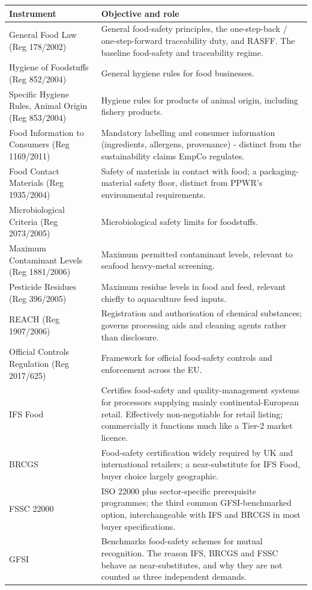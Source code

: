 \footnotesize
\begin{xltabular}{\textwidth}{@{} p{4.1cm} X @{}}
\toprule \textbf{Instrument} & \textbf{Objective and role} \\ \midrule \endhead
General Food Law (Reg 178/2002) & General food-safety principles, the
one-step-back / one-step-forward traceability duty, and RASFF. The baseline
food-safety and traceability regime. \\
Hygiene of Foodstuffs (Reg 852/2004) & General hygiene rules for food businesses. \\
Specific Hygiene Rules, Animal Origin (Reg 853/2004) & Hygiene rules for products
of animal origin, including fishery products. \\
Food Information to Consumers (Reg 1169/2011) & Mandatory labelling and consumer
information (ingredients, allergens, provenance) - distinct from the
sustainability claims EmpCo regulates. \\
Food Contact Materials (Reg 1935/2004) & Safety of materials in contact with food;
a packaging-material safety floor, distinct from PPWR's environmental
requirements. \\
Microbiological Criteria (Reg 2073/2005) & Microbiological safety limits for
foodstuffs. \\
Maximum Contaminant Levels (Reg 1881/2006) & Maximum permitted contaminant levels,
relevant to seafood heavy-metal screening. \\
Pesticide Residues (Reg 396/2005) & Maximum residue levels in food and feed,
relevant chiefly to aquaculture feed inputs. \\
REACH (Reg 1907/2006) & Registration and authorisation of chemical substances;
governs processing aids and cleaning agents rather than disclosure. \\
Official Controls Regulation (Reg 2017/625) & Framework for official food-safety
controls and enforcement across the EU. \\
IFS Food & Certifies food-safety and quality-management systems for processors
supplying mainly continental-European retail. Effectively non-negotiable for retail
listing; commercially it functions much like a Tier-2 market licence. \\
BRCGS & Food-safety certification widely required by UK and international
retailers; a near-substitute for IFS Food, buyer choice largely geographic. \\
FSSC 22000 & ISO 22000 plus sector-specific prerequisite programmes; the third
common GFSI-benchmarked option, interchangeable with IFS and BRCGS in most buyer
specifications. \\
GFSI & Benchmarks food-safety schemes for mutual recognition. The reason IFS,
BRCGS and FSSC behave as near-substitutes, and why they are not counted as three
independent demands. \\
\bottomrule
\end{xltabular}
\normalsize

